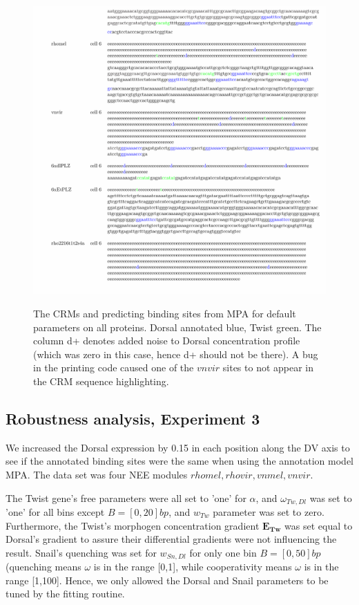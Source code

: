 \begin{figure}
  \includegraphics[width=1\textwidth]{annNosnail.pdf}\\
  \caption{The CRMs and predicting binding sites from MPA for default parameters on all proteins.  Dorsal annotated blue, Twist green. The column d+ denotes added noise to Dorsal concentration profile (which was zero in this case, hence d+ should not be there).  A bug in the printing code caused one of the $vnvir$ sites to not appear in the CRM sequence highlighting. }\label{roughfit}
\end{figure}




\subsection{Robustness analysis, Experiment 3}
We increased the Dorsal expression by 0.15 in each position along the DV axis to see if the annotated binding sites were the same when using the annotation model MPA.  The data set was four NEE modules $rhomel, rhovir, vnmel, vnvir$.


The Twist gene's free parameters were all set to 'one' for $\alpha$, and $\omega_{Tw,Dl}$ was set to 'one' for all bins except $B=[0,20]bp$, and $w_{Tw}$ parameter was set to zero.  Furthermore, the Twist's morphogen concentration gradient $\bm{E_{Tw}}$ was set equal to Dorsal's gradient to assure their differential gradients were not influencing the result.  Snail's quenching was set for $w_{Sn,Dl}$ for only one bin $B=[0,50]bp$ (quenching means $\omega$ is in the range [0,1], while cooperativity means $\omega$ is in the range [1,100].  Hence, we only allowed the Dorsal and Snail parameters to be tuned by the fitting routine.
 
